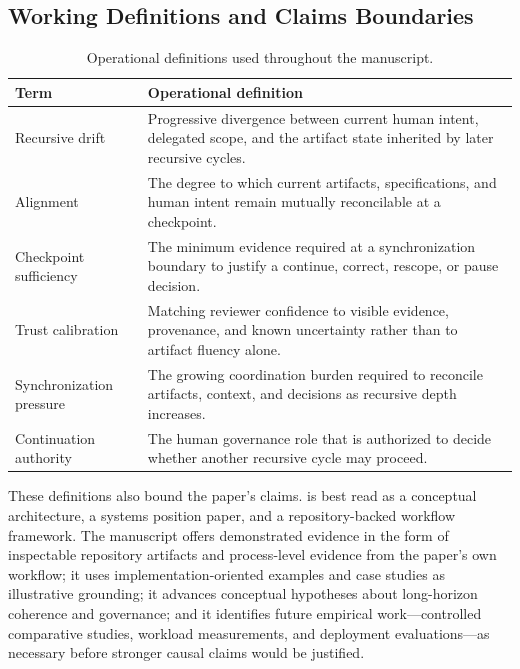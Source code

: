 \subsection{Working Definitions and Claims Boundaries}

\begin{table}[H]
  \centering
  \small
  \caption{Operational definitions used throughout the manuscript.}
  \label{tab:working-definitions}
  \begin{tabularx}{\linewidth}{l X}
    \toprule
    \textbf{Term} & \textbf{Operational definition} \\
    \midrule
    Recursive drift & Progressive divergence between current human intent, delegated scope, and the artifact state inherited by later recursive cycles. \\
    Alignment & The degree to which current artifacts, specifications, and human intent remain mutually reconcilable at a checkpoint. \\
    Checkpoint sufficiency & The minimum evidence required at a synchronization boundary to justify a continue, correct, rescope, or pause decision. \\
    Trust calibration & Matching reviewer confidence to visible evidence, provenance, and known uncertainty rather than to artifact fluency alone. \\
    Synchronization pressure & The growing coordination burden required to reconcile artifacts, context, and decisions as recursive depth increases. \\
    Continuation authority & The human governance role that is authorized to decide whether another recursive cycle may proceed. \\
    \bottomrule
  \end{tabularx}
\end{table}

These definitions also bound the paper's claims.  is best read as a conceptual architecture, a systems position paper, and a repository-backed workflow framework. The manuscript offers demonstrated evidence in the form of inspectable repository artifacts and process-level evidence from the paper's own workflow; it uses implementation-oriented examples and case studies as illustrative grounding; it advances conceptual hypotheses about long-horizon coherence and governance; and it identifies future empirical work---controlled comparative studies, workload measurements, and deployment evaluations---as necessary before stronger causal claims would be justified.

